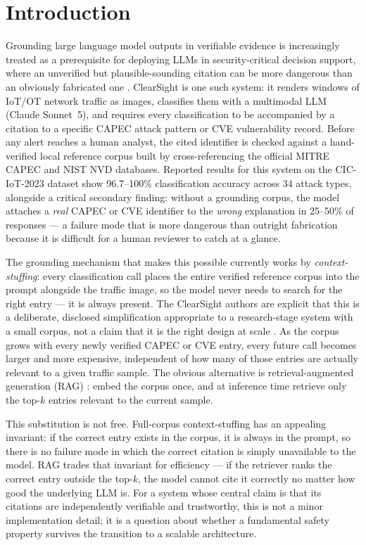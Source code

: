 \documentclass[11pt]{article}
\begin{document}
\section{Introduction}

Grounding large language model outputs in verifiable evidence is increasingly treated as a prerequisite for deploying LLMs in security-critical decision support, where an unverified but plausible-sounding citation can be more dangerous than an obviously fabricated one \citep{clearsight2026}. ClearSight \citep{clearsight2026} is one such system: it renders windows of IoT/OT network traffic as images, classifies them with a multimodal LLM (Claude Sonnet~5), and requires every classification to be accompanied by a citation to a specific CAPEC attack pattern or CVE vulnerability record. Before any alert reaches a human analyst, the cited identifier is checked against a hand-verified local reference corpus built by cross-referencing the official MITRE CAPEC and NIST NVD databases. Reported results for this system on the CIC-IoT-2023 dataset \citep{ciciot2023} show 96.7--100\% classification accuracy across 34 attack types, alongside a critical secondary finding: without a grounding corpus, the model attaches a \emph{real} CAPEC or CVE identifier to the \emph{wrong} explanation in 25--50\% of responses --- a failure mode that is more dangerous than outright fabrication because it is difficult for a human reviewer to catch at a glance.

The grounding mechanism that makes this possible currently works by \emph{context-stuffing}: every classification call places the entire verified reference corpus into the prompt alongside the traffic image, so the model never needs to search for the right entry --- it is always present. The ClearSight authors are explicit that this is a deliberate, disclosed simplification appropriate to a research-stage system with a small corpus, not a claim that it is the right design at scale \citep{clearsight2026}. As the corpus grows with every newly verified CAPEC or CVE entry, every future call becomes larger and more expensive, independent of how many of those entries are actually relevant to a given traffic sample. The obvious alternative is retrieval-augmented generation (RAG) \citep{lewis2020rag}: embed the corpus once, and at inference time retrieve only the top-$k$ entries relevant to the current sample.

This substitution is not free. Full-corpus context-stuffing has an appealing invariant: if the correct entry exists in the corpus, it is always in the prompt, so there is no failure mode in which the correct citation is simply unavailable to the model. RAG trades that invariant for efficiency --- if the retriever ranks the correct entry outside the top-$k$, the model cannot cite it correctly no matter how good the underlying LLM is. For a system whose central claim is that its citations are independently verifiable and trustworthy, this is not a minor implementation detail; it is a question about whether a fundamental safety property survives the transition to a scalable architecture.
\end{document}
